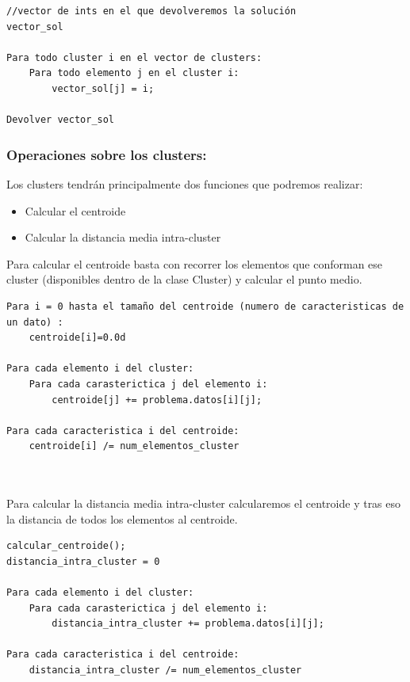 \documentclass[12pt, spanish]{article}
\begin{document}
\begin{lstlisting}
//vector de ints en el que devolveremos la solución
vector_sol 

Para todo cluster i en el vector de clusters:
	Para todo elemento j en el cluster i:
		vector_sol[j] = i;
		
Devolver vector_sol

\end{lstlisting}


\subsubsection{Operaciones sobre los clusters:}

Los clusters tendrán principalmente dos funciones que podremos realizar:

\begin{itemize}
	\item {Calcular el centroide}
	\item {Calcular la distancia media intra-cluster}
\end{itemize}

Para calcular el centroide basta con recorrer los elementos que conforman ese cluster (disponibles dentro de la clase Cluster) y calcular el punto medio.

\begin{lstlisting}
Para i = 0 hasta el tamaño del centroide (numero de caracteristicas de un dato) :
	centroide[i]=0.0d
	
Para cada elemento i del cluster:
	Para cada carasterictica j del elemento i:
		centroide[j] += problema.datos[i][j];
		
Para cada caracteristica i del centroide:
	centroide[i] /= num_elementos_cluster 
	
	
\end{lstlisting}

Para calcular la distancia media intra-cluster calcularemos el centroide y tras eso la distancia de todos los elementos al centroide.


\begin{lstlisting}
calcular_centroide();
distancia_intra_cluster = 0
	
Para cada elemento i del cluster:
	Para cada carasterictica j del elemento i:
		distancia_intra_cluster += problema.datos[i][j];
		
Para cada caracteristica i del centroide:
	distancia_intra_cluster /= num_elementos_cluster 
	
	
\end{lstlisting}
\end{document}

